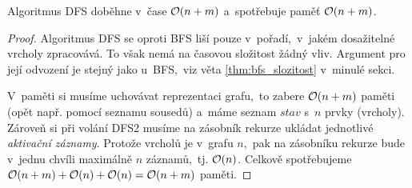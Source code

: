 \begin{theorem}\label{thm:dfs_slozitost}
    Algoritmus DFS doběhne v~čase $\mathcal{O}(n+m)$ a~spotřebuje paměť $\mathcal{O}(n+m)$.
\end{theorem}
\begin{proof}
    Algoritmus DFS se oproti BFS liší pouze v~pořadí,~v~jakém dosažitelné vrcholy zpracovává. To však nemá na časovou složitost žádný vliv. Argument pro její odvození je stejný jako u~BFS,~viz věta \ref{thm:bfs_slozitost} v~minulé sekci.

    V~paměti si musíme uchovávat reprezentaci grafu,~to zabere $\mathcal{O}(n+m)$ paměti (opět např. pomocí seznamu sousedů) a~máme seznam $stav$ s~$n$ prvky (vrcholy). Zároveň si při volání \textsc{DFS2} musíme na zásobník rekurze ukládat jednotlivé \emph{aktivační záznamy}. Protože vrcholů je v~grafu $n$,~pak na zásobníku rekurze bude v~jednu chvíli maximálně $n$ záznamů,~tj. $\mathcal{O}(n)$. Celkově spotřebujeme $\mathcal{O}(n+m)+\mathcal{O}(n)+\mathcal{O}(n)=\mathcal{O}(n+m)$ paměti.
\end{proof}
